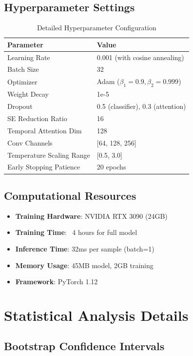 \documentclass[10pt,a4paper]{article}
\begin{document}
\subsection{Hyperparameter Settings}

\begin{table}[h!]
\centering
\caption{Detailed Hyperparameter Configuration}
\begin{tabular}{ll}
\toprule
\textbf{Parameter} & \textbf{Value} \\
\midrule
Learning Rate & 0.001 (with cosine annealing) \\
Batch Size & 32 \\
Optimizer & Adam ($\beta_1=0.9, \beta_2=0.999$) \\
Weight Decay & 1e-5 \\
Dropout & 0.5 (classifier), 0.3 (attention) \\
SE Reduction Ratio & 16 \\
Temporal Attention Dim & 128 \\
Conv Channels & [64, 128, 256] \\
Temperature Scaling Range & [0.5, 3.0] \\
Early Stopping Patience & 20 epochs \\
\bottomrule
\end{tabular}
\end{table}

\subsection{Computational Resources}

\begin{itemize}
\item \textbf{Training Hardware}: NVIDIA RTX 3090 (24GB)
\item \textbf{Training Time}: ~4 hours for full model
\item \textbf{Inference Time}: 32ms per sample (batch=1)
\item \textbf{Memory Usage}: 45MB model, 2GB training
\item \textbf{Framework}: PyTorch 1.12
\end{itemize}

\section{Statistical Analysis Details}

\subsection{Bootstrap Confidence Intervals}
\end{document}

